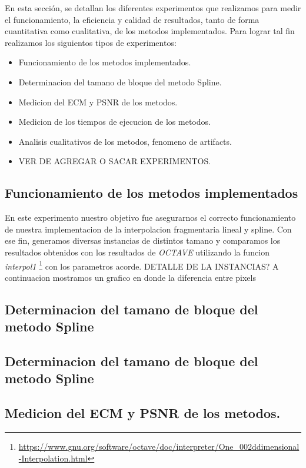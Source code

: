En esta sección, se detallan los diferentes experimentos que realizamos para medir el funcionamiento, la eficiencia y calidad de resultados, tanto de forma cuantitativa como cualitativa, de los metodos implementados.
Para lograr tal fin realizamos los siguientos tipos de experimentos:
\begin{itemize}
  \item Funcionamiento de los metodos implementados.
  \item Determinacion del tamano de bloque del metodo Spline.
  \item Medicion del ECM y PSNR de los metodos.
  \item Medicion de los tiempos de ejecucion de los metodos.
  \item Analisis cualitativos de los metodos, fenomeno de artifacts.
  \item VER DE AGREGAR O SACAR EXPERIMENTOS.
\end{itemize}

\subsection{Funcionamiento de los metodos implementados}
En este experimento nuestro objetivo fue asegurarnos el correcto funcionamiento de nuestra implementacion de la interpolacion fragmentaria lineal y spline. Con ese fin, generamos diversas instancias de distintos tamano y comparamos los resultados obtenidos con los resultados de \textit{OCTAVE} utilizando la funcion \textit{interpol1} \footnote{\url{https://www.gnu.org/software/octave/doc/interpreter/One_002ddimensional-Interpolation.html}} con los parametros acorde.
DETALLE DE LA INSTANCIAS?
A continuacion mostramos un grafico en donde la diferencia entre pixels

\subsection{Determinacion del tamano de bloque del metodo Spline}


\subsection{Determinacion del tamano de bloque del metodo Spline}


\subsection{Medicion del ECM y PSNR de los metodos.}


